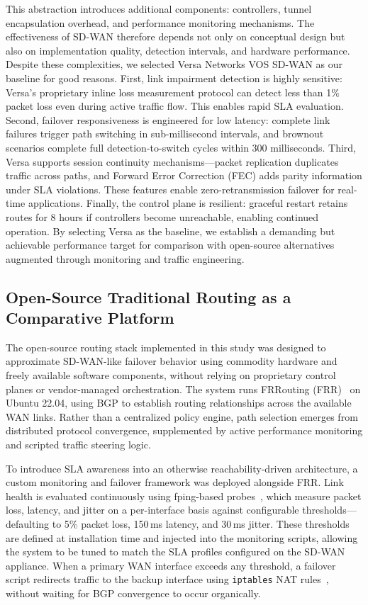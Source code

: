 \documentclass[conference]{IEEEtran}
\begin{document}
This abstraction introduces additional components: controllers, 
tunnel encapsulation overhead, and performance monitoring mechanisms. 
The effectiveness of SD-WAN therefore depends not only on conceptual 
design but also on implementation quality, detection intervals, and 
hardware performance. Despite these complexities, we selected Versa 
Networks VOS SD-WAN as our baseline for good reasons. First, link 
impairment detection is highly sensitive: Versa's proprietary inline 
loss measurement protocol can detect less than 1\% packet loss even 
during active traffic flow. This enables rapid SLA evaluation. Second, 
failover responsiveness is engineered for low latency: complete link 
failures trigger path switching in sub-millisecond intervals, and 
brownout scenarios complete full detection-to-switch cycles within 300 
milliseconds. Third, Versa supports session continuity mechanisms—packet 
replication duplicates traffic across paths, and Forward Error Correction 
(FEC) adds parity information under SLA violations. These features enable 
zero-retransmission failover for real-time applications. Finally, the 
control plane is resilient: graceful restart retains routes for 8 hours 
if controllers become unreachable, enabling continued operation. By 
selecting Versa as the baseline, we establish a demanding but achievable 
performance target for comparison with open-source alternatives augmented 
through monitoring and traffic engineering.

\subsection{Open-Source Traditional Routing as a Comparative Platform}

The open-source routing stack implemented in this study was designed 
to approximate SD-WAN-like failover behavior using commodity hardware 
and freely available software components, without relying on proprietary 
control planes or vendor-managed orchestration. The system runs 
FRRouting (FRR)~\cite{frr2023} on Ubuntu 22.04, using BGP to 
establish routing relationships across the available WAN links. Rather 
than a centralized policy engine, path selection emerges from distributed 
protocol convergence, supplemented by active performance monitoring and 
scripted traffic steering logic.

To introduce SLA awareness into an otherwise reachability-driven 
architecture, a custom monitoring and failover framework was deployed 
alongside FRR. Link health is evaluated continuously using fping-based 
probes~\cite{fping}, which measure packet loss, latency, and jitter on 
a per-interface basis against configurable thresholds---defaulting to 
5\% packet loss, 150\,ms latency, and 30\,ms jitter. These thresholds 
are defined at installation time and injected into the monitoring 
scripts, allowing the system to be tuned to match the SLA profiles 
configured on the SD-WAN appliance. When a primary WAN interface 
exceeds any threshold, a failover script redirects traffic to the backup 
interface using \texttt{iptables} NAT rules~\cite{iptables_persistent}, 
without waiting for BGP convergence to occur organically.
\end{document}

